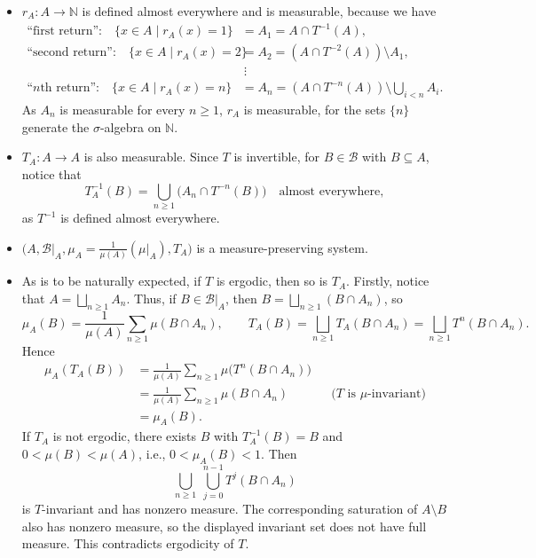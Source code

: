 \documentclass[11pt,a4paper]{article}
\begin{document}
\begin{itemize}
\item $r_A\colon A\to\mathbb N$ is defined almost everywhere and is measurable, because we have
\[
\begin{aligned}
 \text{``first return'':}\quad \{x\in A\mid r_A(x)=1\}&=A_1=A\cap T^{-1}(A),\\
 \text{``second return'':}\quad \{x\in A\mid r_A(x)=2\}&=A_2=(A\cap T^{-2}(A))\setminus A_1,\\
 &\ \vdots\\
 \text{``$n$th return'':}\quad \{x\in A\mid r_A(x)=n\}&=A_n=(A\cap T^{-n}(A))\setminus\bigcup_{i<n}A_i.
\end{aligned}
\]
As $A_n$ is measurable for every $n\geq1$, $r_A$ is measurable, for the sets $\{n\}$ generate the $\sigma$-algebra on $\mathbb N$.

\item $T_A\colon A\to A$ is also measurable. Since $T$ is invertible, for $B\in\mathcal B$ with $B\subseteq A$, notice that
\[
 T_A^{-1}(B)=\bigcup_{n\geq1}\bigl(A_n\cap T^{-n}(B)\bigr)
 \quad\text{almost everywhere},
\]
as $T^{-1}$ is defined almost everywhere.
\end{itemize}

\begin{itemize}
\item $\bigl(A,\mathcal B|_A,\mu_A=\frac1{\mu(A)}(\mu|_A),T_A\bigr)$ is a measure-preserving system.
\item As is to be naturally expected, if $T$ is ergodic, then so is $T_A$.
Firstly, notice that $A=\bigsqcup_{n\geq1}A_n$. Thus, if
$B\in\mathcal B|_A$, then $B=\bigsqcup_{n\geq1}(B\cap A_n)$, so
\[
 \mu_A(B)=\frac1{\mu(A)}\sum_{n\geq1}\mu(B\cap A_n),
 \qquad
 T_A(B)=\bigsqcup_{n\geq1}T_A(B\cap A_n)
       =\bigsqcup_{n\geq1}T^n(B\cap A_n).
\]
Hence
\[
\begin{aligned}
 \mu_A(T_A(B))
 &=\frac1{\mu(A)}\sum_{n\geq1}\mu\bigl(T^n(B\cap A_n)\bigr)\\
 &=\frac1{\mu(A)}\sum_{n\geq1}\mu(B\cap A_n)
   &&\text{($T$ is $\mu$-invariant)}\\
 &=\mu_A(B).
\end{aligned}
\]
If $T_A$ is not ergodic, there exists $B$ with $T_A^{-1}(B)=B$ and $0<\mu(B)<\mu(A)$, i.e., $0<\mu_A(B)<1$. Then
\[
 \bigcup_{n\geq1}\ \bigcup_{j=0}^{n-1}T^j(B\cap A_n)
\]
is $T$-invariant and has nonzero measure. The corresponding saturation of $A\setminus B$ also has nonzero measure, so the displayed invariant set does not have full measure. This contradicts ergodicity of $T$.
\end{itemize}
\end{document}
